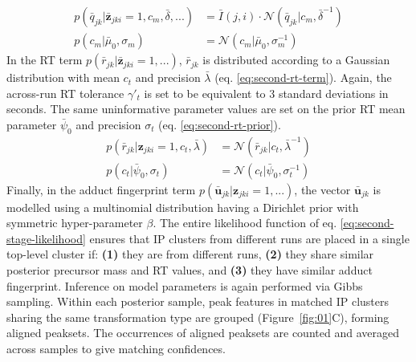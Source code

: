 \begin{align}
p({\bar{q}}_{jk}\vert\boldsymbol{\bar{z}}_{jki}=1,c_m,\bar{\delta},...) &= \bar{I}(j,i) \cdot \mathcal{N}(\bar{q}_{jk} \vert c_m,\bar{\delta}^{-1}) \label{eq:second-mass-term}\\
p(c_m\vert \bar{\mu}_0,\sigma_m) &= \mathcal{N}(c_m \vert \bar{\mu}_0,\sigma_m^{-1}) \label{eq:second-mass-prior}
\end{align}
In the RT term $p({\bar{r}}_{jk}\vert\boldsymbol{\bar{z}}_{jki}=1,...)$, ${\bar{r}}_{jk}$ is distributed according to a Gaussian distribution with mean $c_t$ and precision $\bar{\lambda}$ (eq. \ref{eq:second-rt-term}). Again, the across-run RT tolerance $\gamma'_t$ is set to be equivalent to 3 standard deviations in seconds. The same uninformative parameter values are set on the prior RT mean parameter $\bar{\psi}_0$ and precision $\sigma_t$ (eq. \ref{eq:second-rt-prior}).
\begin{align}
p({\bar{r}}_{jk}\vert\boldsymbol{z}_{jki}=1,c_t,\bar{\lambda}) &= \mathcal{N}({\bar{r}}_{jk} \vert c_t,\bar{\lambda}^{-1}) \label{eq:second-rt-term}\\
p(c_t\vert \bar{\psi}_0,\sigma_t) &= \mathcal{N}(c_t \vert \bar{\psi}_0,\sigma_t^{-1}) \label{eq:second-rt-prior}
\end{align}
Finally, in the adduct fingerprint term $p({\boldsymbol{\bar{u}}}_{jk}\vert\boldsymbol{z}_{jki}=1,...)$, the vector ${\boldsymbol{\bar{u}}}_{jk}$ is modelled using a multinomial distribution having a Dirichlet prior with symmetric hyper-parameter $\beta$.
The entire likelihood function of eq. \ref{eq:second-stage-likelihood} ensures that IP clusters from different runs are placed in a single top-level cluster if: \textbf{(1)} they are from different runs, \textbf{(2)} they share similar posterior precursor mass and RT values, and \textbf{(3)} they have similar adduct fingerprint. Inference on model parameters is again performed via Gibbs sampling. Within each posterior sample, peak features in matched IP clusters sharing the same transformation type are grouped (Figure~\ref{fig:01}C), forming aligned peaksets. The occurrences of aligned peaksets are counted and averaged across samples to give matching confidences.

